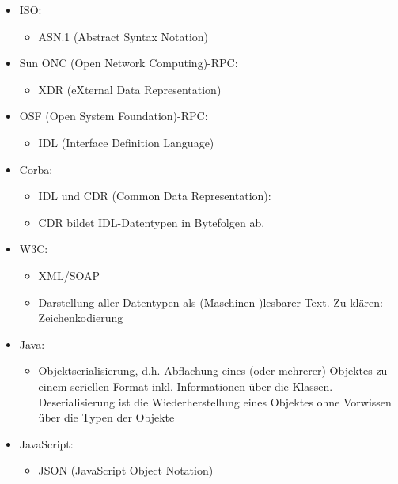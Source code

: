\begin{itemize}
    \item ISO:
    \begin{itemize}
        \item ASN.1 (Abstract Syntax Notation)
    \end{itemize}
    \item Sun ONC (Open Network Computing)-RPC:
    \begin{itemize}
        \item XDR (eXternal Data Representation)
    \end{itemize}
    \item OSF (Open System Foundation)-RPC:
    \begin{itemize}
        \item IDL (Interface Definition Language)
    \end{itemize}
    \item Corba:
    \begin{itemize}
        \item IDL und CDR (Common Data Representation):
        \item CDR bildet IDL-Datentypen in Bytefolgen ab.
    \end{itemize}
    \item W3C:
    \begin{itemize}
        \item XML/SOAP
        \item Darstellung aller Datentypen als (Maschinen-)lesbarer Text. Zu klären: Zeichenkodierung
    \end{itemize}
    \item Java:
    \begin{itemize}
        \item Objektserialisierung, d.h. Abflachung eines (oder mehrerer) Objektes zu einem seriellen Format inkl. Informationen über die Klassen. Deserialisierung ist die Wiederherstellung eines Objektes ohne Vorwissen über die Typen der Objekte
    \end{itemize}
    \item JavaScript:
    \begin{itemize}
        \item JSON (JavaScript Object Notation)
    \end{itemize}
\end{itemize}


